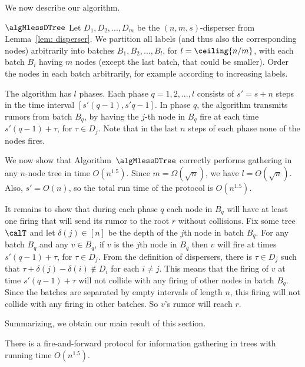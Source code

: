 We now describe our algorithm.



\begin{myalgorithm}{$\algMlessDTree$}
Let $D_1,D_2,...,D_m$ be the $(n,m,s)$-disperser from Lemma~\ref{lem: disperser}. 
We partition all labels (and thus also the corresponding nodes) arbitrarily
into batches $B_1,B_2,...,B_l$, for $l = \ceiling{n/m}$, with each batch $B_i$ having $m$
nodes (except the last batch, that could be smaller).
Order the nodes in each batch arbitrarily, for example according to increasing labels.

The algorithm has $l$ phases. Each phase $q = 1,2,...,l$ consists of $s'=s+n$ steps in the time interval
$[s'(q-1), s'q-1]$. In phase $q$, the algorithm transmits rumors from batch $B_q$,
by having the $j$-th node in $B_q$ fire at each time $s'(q-1) + \tau$, for $\tau\in D_j$.
Note that in the last $n$ steps of each phase none of the nodes fires.
\end{myalgorithm}



We now show that Algorithm~$\algMlessDTree$ correctly performs gathering in any $n$-node
tree in time $O(n^{1.5})$.  Since $m = \Omega(\sqrt{n})$, we have
$l = O(\sqrt{n})$. Also, $s' = O(n)$, so the total run time of the protocol is $O(n^{1.5})$.

It remains to show that during each phase $q$ each
node in $B_q$ will have at least one firing that will send its rumor to the root $r$ without collisions.
Fix some tree $\calT$ and let $\delta(j)\in [n]$ be the depth of the
$j$th node in batch $B_q$.
For any batch $B_q$ and any $v\in B_q$, if $v$ is the
$j$th node in $B_q$ then $v$ will fire at times $s'(q-1) + \tau$, for $\tau\in D_j$.
From the definition of dispersers, there is
$\tau \in D_j$ such that $\tau + \delta(j) - \delta(i) \notin D_i$ for each $i\neq j$.
This means that the firing of $v$ at time $s'(q-1) + \tau$ will not collide with any
firing of other nodes in batch $B_q$. Since the batches are separated by empty intervals
of length $n$, this firing will not collide with any firing in other batches.
So $v$'s rumor will reach $r$. 

Summarizing, we obtain our main result of this section.



\begin{theorem}\label{thm: n^1.5 fire-and-forward upper bound}
There is a fire-and-forward protocol for information gathering in trees
with running time $O(n^{1.5})$.
\end{theorem}


